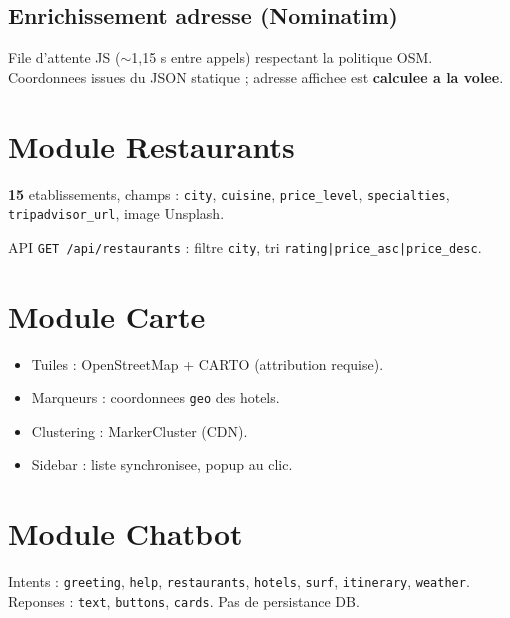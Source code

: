 \animHotelLoad


\subsection{Enrichissement adresse (Nominatim)}

File d'attente JS ($\sim$1,15 s entre appels) respectant la politique OSM. Coordonnees issues du JSON statique ; adresse affichee est \textbf{calculee a la volee}.

\section{Module Restaurants}

\textbf{15} etablissements, champs : \texttt{city}, \texttt{cuisine}, \texttt{price\_level}, \texttt{specialties}, \texttt{tripadvisor\_url}, image Unsplash.

API \texttt{GET /api/restaurants} : filtre \texttt{city}, tri \texttt{rating|price\_asc|price\_desc}.


\section{Module Carte}

\begin{itemize}
  \item Tuiles : OpenStreetMap + CARTO (attribution requise).
  \item Marqueurs : coordonnees \texttt{geo} des hotels.
  \item Clustering : MarkerCluster (CDN).
  \item Sidebar : liste synchronisee, popup au clic.
\end{itemize}

\animMapFlow
{}

\section{Module Chatbot}

Intents : \texttt{greeting}, \texttt{help}, \texttt{restaurants}, \texttt{hotels}, \texttt{surf}, \texttt{itinerary}, \texttt{weather}. Reponses : \texttt{text}, \texttt{buttons}, \texttt{cards}. Pas de persistance DB.

